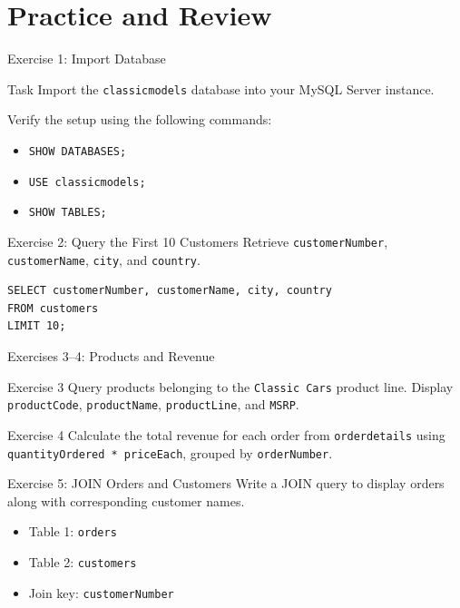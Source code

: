 \documentclass[aspectratio=169,professionalfonts]{beamer}
\newcommand{\code}[1]{\texttt{#1}}
\begin{document}
\section{Practice and Review}

\begin{frame}{Exercise 1: Import Database}
\begin{block}{Task}
Import the \code{classicmodels} database into your MySQL Server instance.
\end{block}
Verify the setup using the following commands:
\begin{itemize}
  \item \code{SHOW DATABASES;}
  \item \code{USE classicmodels;}
  \item \code{SHOW TABLES;}
\end{itemize}
\end{frame}

\begin{frame}[fragile]{Exercise 2: Query the First 10 Customers}
Retrieve \code{customerNumber}, \code{customerName}, \code{city}, and \code{country}.
\begin{lstlisting}[style=sqlstyle]
SELECT customerNumber, customerName, city, country
FROM customers
LIMIT 10;
\end{lstlisting}
\end{frame}

\begin{frame}{Exercises 3--4: Products and Revenue}
\begin{block}{Exercise 3}
Query products belonging to the \code{Classic Cars} product line. Display \code{productCode}, \code{productName}, \code{productLine}, and \code{MSRP}.
\end{block}
\begin{block}{Exercise 4}
Calculate the total revenue for each order from \code{orderdetails} using \code{quantityOrdered * priceEach}, grouped by \code{orderNumber}.
\end{block}
\end{frame}

\begin{frame}{Exercise 5: JOIN Orders and Customers}
Write a JOIN query to display orders along with corresponding customer names.
\vspace{0.5em}
\begin{itemize}
  \item Table 1: \code{orders}
  \item Table 2: \code{customers}
  \item Join key: \code{customerNumber}
\end{itemize}
\end{frame}
\end{document}
